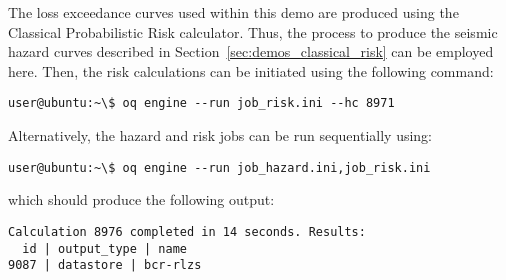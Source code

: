 The loss exceedance curves used within this demo are produced using the
Classical Probabilistic Risk calculator. Thus, the process to produce the
seismic hazard curves described in Section~\ref{sec:demos_classical_risk} can
be employed here. Then, the risk calculations can be initiated using the
following command:

\begin{verbatim}
user@ubuntu:~\$ oq engine --run job_risk.ini --hc 8971
\end{verbatim}

Alternatively, the hazard and risk jobs can be run sequentially using:

\begin{verbatim}
user@ubuntu:~\$ oq engine --run job_hazard.ini,job_risk.ini
\end{verbatim}

which should produce the following output:

\begin{verbatim}
Calculation 8976 completed in 14 seconds. Results:
  id | output_type | name
9087 | datastore | bcr-rlzs
\end{verbatim}
